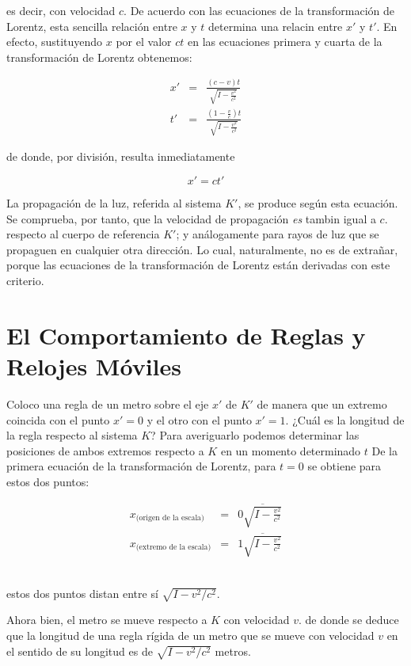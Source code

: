 \documentclass[spanish]{book}
\begin{document}
\noindent es decir, con velocidad $c$. De acuerdo con las ecuaciones de la transformación de
Lorentz, esta sencilla relación entre $x$ y $t$ determina una relacin entre  $x'$ y $t'$. En efecto,
sustituyendo $x$ por el valor $ct$ en las ecuaciones primera y cuarta de la transformación
de Lorentz obtenemos:

\begin{eqnarray*}
x' & = & \frac{(c-v)t}{\sqrt{I-\frac{v^{2}}{c^{2}}}}\\
t' & = & \frac{(1-\frac{v}{c})t}{\sqrt{I-\frac{v^{2}}{c^{2}}}}
\end{eqnarray*}

\noindent de donde, por división, resulta inmediatamente

\[x'=ct'\]

\noindent La propagación de la luz, referida al sistema $K'$, se produce según esta ecuación.
Se comprueba, por tanto, que la velocidad de propagación \textit{es} tambin igual a
$c$. respecto al cuerpo de referencia $K'$; y análogamente para rayos de luz que se
propaguen en cualquier otra dirección. Lo cual, naturalmente, no es de extrañar,
porque las ecuaciones de la transformación de Lorentz están derivadas con este
criterio.


\chapter{El Comportamiento de Reglas y Relojes Móviles}

Coloco una regla de un metro sobre el eje $x'$ de $K'$ de manera que un extremo
coincida con el punto $x'=0$ y el otro con el punto $x'=1$. ¿Cuál es la longitud de la
regla respecto al sistema $K$? Para averiguarlo podemos determinar las posiciones de
ambos extremos respecto a $K$ en un momento determinado $t$ De la primera ecuación
de la transformación de Lorentz, para $t=0$ se obtiene para estos dos puntos:

\begin{eqnarray*}
x_{\mbox{(origen de la escala)}} & = & 0\overline{\sqrt{I-\frac{v^{2}}{c^{2}}}}\\
x_{\mbox{(extremo de la escala)}} & = & 1\overline{\sqrt{I-\frac{v^{2}}{c^{2}}}}
\end{eqnarray*}
 ~

\noindent estos dos puntos distan entre sí $\sqrt{I-v^{2}/c^{2}}$.

Ahora bien, el metro se mueve respecto a $K$ con velocidad $v$. de donde se
deduce que la longitud de una regla rígida de un metro que se mueve con velocidad
$v$ en el sentido de su longitud es de $\sqrt{I-v^{2}/c^{2}}$ metros.
\end{document}

